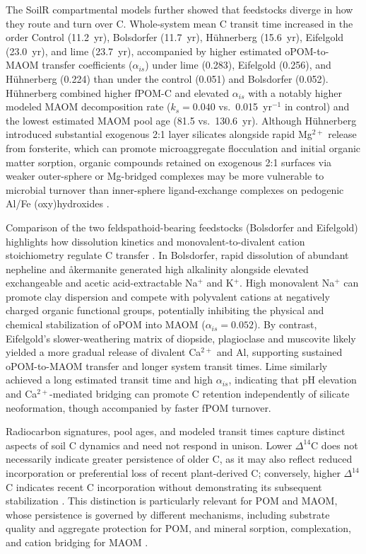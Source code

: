 \documentclass[preprint,12pt]{elsarticle}
\begin{document}
The SoilR compartmental models further showed that feedstocks diverge in how they route and turn over C. Whole-system mean C transit time increased in the order Control (11.2~yr), Bolsdorfer (11.7~yr), H\"uhnerberg (15.6~yr), Eifelgold (23.0~yr), and lime (23.7~yr), accompanied by higher estimated oPOM-to-MAOM transfer coefficients ($\alpha_{is}$) under lime (0.283), Eifelgold (0.256), and H\"uhnerberg (0.224) than under the control (0.051) and Bolsdorfer (0.052). H\"uhnerberg combined higher fPOM-C and elevated $\alpha_{is}$ with a notably higher modeled MAOM decomposition rate ($k_s = 0.040$ vs.\ 0.015~yr$^{-1}$ in control) and the lowest estimated MAOM pool age (81.5 vs.\ 130.6~yr). Although H\"uhnerberg introduced substantial exogenous 2:1 layer silicates alongside rapid Mg$^{2+}$ release from forsterite, which can promote microaggregate flocculation and initial organic matter sorption, organic compounds retained on exogenous 2:1 surfaces via weaker outer-sphere or Mg-bridged complexes may be more vulnerable to microbial turnover than inner-sphere ligand-exchange complexes on pedogenic Al/Fe (oxy)hydroxides \citep{sun2026tradeoff,khomo2017timescales}.

Comparison of the two feldspathoid-bearing feedstocks (Bolsdorfer and Eifelgold) highlights how dissolution kinetics and monovalent-to-divalent cation stoichiometry regulate C transfer \citep{marchuk2013influence}. In Bolsdorfer, rapid dissolution of abundant nepheline and \aa kermanite generated high alkalinity alongside elevated exchangeable and acetic acid-extractable Na$^{+}$ and K$^{+}$. High monovalent Na$^{+}$ can promote clay dispersion and compete with polyvalent cations at negatively charged organic functional groups, potentially inhibiting the physical and chemical stabilization of oPOM into MAOM ($\alpha_{is} = 0.052$). By contrast, Eifelgold's slower-weathering matrix of diopside, plagioclase and muscovite likely yielded a more gradual release of divalent Ca$^{2+}$ and Al, supporting sustained oPOM-to-MAOM transfer and longer system transit times. Lime similarly achieved a long estimated transit time and high $\alpha_{is}$, indicating that pH elevation and Ca$^{2+}$-mediated bridging can promote C retention independently of silicate neoformation, though accompanied by faster fPOM turnover.

Radiocarbon signatures, pool ages, and modeled transit times capture distinct aspects of soil C dynamics and need not respond in unison. Lower $\Delta^{14}$C does not necessarily indicate greater persistence of older C, as it may also reflect reduced incorporation or preferential loss of recent plant-derived C; conversely, higher $\Delta^{14}$C indicates recent C incorporation without demonstrating its subsequent stabilization \citep{khomo2017timescales,franks2021role,fernandezugalde2014mechanisms}. This distinction is particularly relevant for POM and MAOM, whose persistence is governed by different mechanisms, including substrate quality and aggregate protection for POM, and mineral sorption, complexation, and cation bridging for MAOM \citep{lavallee2019conceptualizing,rocci2024bridging}.
\end{document}
